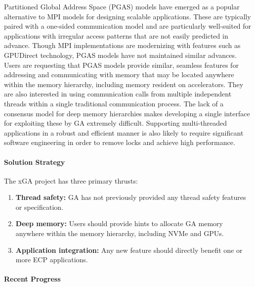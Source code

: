 Partitioned Global Address Space (PGAS) models have emerged as a popular
alternative to MPI models for designing scalable applications. These are
typically paired with a one-sided communication model and are particularly
well-suited for applications with irregular access patterns that are not easily
predicted in advance.
Though MPI implementations are modernizing with features such as
GPUDirect technology, PGAS models have not maintained similar advances.
Users are requesting that PGAS models provide similar, seamless
features for addressing and communicating with memory that may be located
anywhere within the memory hierarchy, including memory resident on
accelerators. They are also interested in using communication calls from
multiple independent threads within a single traditional communication process.
The lack of a consensus model for
deep memory hierarchies makes developing a single interface for exploiting these
by GA
extremely difficult.
Supporting multi-threaded applications in a robust and efficient manner is also
likely to require significant software engineering in order to remove locks and
achieve high performance.

\paragraph{Solution Strategy}

The xGA project has three primary thrusts:
\begin{enumerate}
\item \textbf{Thread safety:} GA has not previously provided any thread safety
features or specification.
\item \textbf{Deep memory:} Users should provide hints to allocate GA
memory anywhere within the memory hierarchy, including NVMe and GPUs. 
\item \textbf{Application integration:} Any new feature should directly
benefit one or more ECP applications.
\end{enumerate}

\paragraph{Recent Progress}

